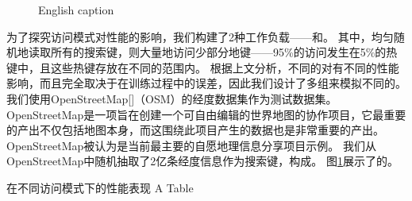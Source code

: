 
\begin{figure}[!htp]
  \centering
    {English caption}
  \label{fig:osm-cdf}
\end{figure}

为了探究访问模式对{\li}性能的影响，我们构建了2种工作负载{------}{\uniwl}和{\skewwl}。
其中，{\uniwl}均匀随机地读取所有的搜索键，{\skewwl}则大量地访问少部分地键{------}95\%的访问发生在5\%的热键中，且这些热键存放在不同的范围内。
根据上文分析，不同的{\skewacc}对{\rmi}有不同的性能影响，而且完全取决于{\model}在训练过程中的误差，因此我们设计了多组{\skewwl}来模拟不同的{\skewacc}。
我们使用OpenStreetMap[]（OSM）的经度数据集作为测试数据集。
OpenStreetMap是一项旨在创建一个可自由编辑的世界地图的协作项目，它最重要的产出不仅包括地图本身，而这围绕此项目产生的数据也是非常重要的产出。
OpenStreetMap被认为是当前最主要的自愿地理信息分享项目示例。
我们从OpenStreetMap中随机抽取了2亿条经度信息作为搜索键，构成{\osm}。
图\ref{fig:osm-cdf}展示了{\osm}的{\cdf}。



\begin{table}[!hpb]
  \centering
  \bicaption[指向一个表格的表目录索引]
    {{\li}在不同访问模式下的性能表现}
    {A Table}
  \label{tab:pattern}
  \begin{tabular}{@{}llr@{}} \toprule
  \end{tabular}
\end{table}

